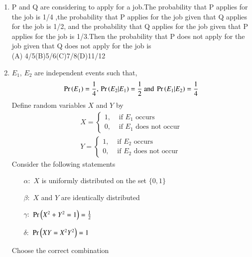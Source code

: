 \begin{enumerate}[label=\thesection.\arabic*.,ref=\thesection.\theenumi]
%
\item P and Q are considering to apply for a job.The probability that P applies for the job is 1/4 ,the probability that P applies for the job given that Q applies for the job is 1/2, and the probability that Q applies for the job given that P applies for the job is 1/3.Then the probability that P does not apply for the job given that Q does not apply for the job is\\ 
(A) 4/5\quad\quad(B)5/6\quad\quad(C)7/8\quad\quad(D)11/12
\\
\solution

%
%
\item $E_1$, $E_2$ are independent events such that,
\begin{align*}
    \Pr\left(E_1\right) = \frac{1}{4},\,\Pr\left(E_2|E_1\right) = \frac{1}{2} \text{ and } \Pr\left(E_1|E_2\right) = \frac{1}{4}
\end{align*}
Define random variables $X$ and $Y$ by\\
\begin{align}
X=
\begin{cases}
1, &\text{ if $E_1$ occurs}\\
0, &\text{ if $E_1$ does not occur}
\end{cases}
\\
Y=
\begin{cases}
1, &\text{ if $E_2$ occurs}\\
0, &\text{ if $E_2$ does not occur}
\end{cases}
\end{align}
Consider the following statements
\begin{itemize}
    \item[$\alpha:$]$X$ is uniformly distributed on the set $\{0,1\}$
    \item[$\beta:$]$X$ and $Y$ are identically distributed
    \item[$\gamma:$]$\Pr\left(X^2 + Y^2 = 1\right) = \frac{1}{2}$
    \item[$\delta:$]$\Pr\left(XY=X^2Y^2\right) = 1$
\end{itemize}
Choose the correct combination
\begin{enumerate}[label = (\alph*)]
\end{enumerate}
%
\solution



\end{enumerate}
